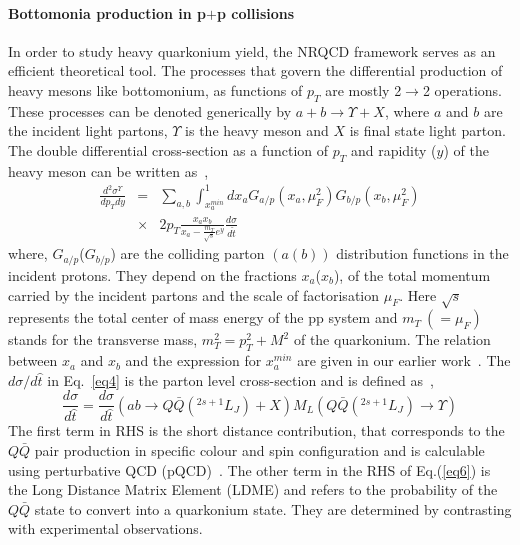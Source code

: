 \documentclass[review]{elsarticle}
\begin{document}
\paragraph{Bottomonia production in p$+$p collisions}
\label{sec:formalism}
In order to study heavy quarkonium yield, the NRQCD framework serves as an
efficient theoretical tool. The processes that govern the differential
production of heavy mesons like bottomonium, as functions of $p_T$ are mostly
2$\rightarrow$2 operations. These processes can be denoted generically by 
$a+b\rightarrow \Upsilon +X$, where $a$ and $b$ are the incident light partons,
$\Upsilon$ is the heavy meson and $X$ is final state light parton.
The double differential cross-section as a function of $p_T$ and rapidity ($y$) of 
the heavy meson can be written as~\cite{Kumar:2016ojy},
\begin{eqnarray}
  \nonumber
  \frac{d^2\sigma^{\Upsilon} }{dp_T dy} &=& \sum_{a,b} \int_{x_a^{min}}^1 dx_a G_{a/p}(x_a,\mu_F^2)
  G_{b/p}(x_b,\mu_F^2) \\
  &\times& 2p_T\frac{x_a x_b}{x_a - \frac{m_T}{\sqrt{s}}e^y}\frac{d\sigma}{d\hat{t}}
  \label{eq4}
\end{eqnarray}
where, $G_{a/p}$($G_{b/p}$) are the colliding parton $(a(b))$ distribution functions in
the incident protons. They depend on the fractions $x_a$($x_b$), of the total momentum
carried by the incident partons and the scale of factorisation $\mu_F$.
Here $\sqrt{s}$ represents the total center of mass energy of the pp system and $m_T~(=\mu_F)$ stands for
the transverse mass, $m_T^2=p_T^2 + M^2$ of the quarkonium. The relation between
$x_a$ and $x_b$ and the expression for $x_a^{min}$ are given in our earlier work~\cite{Kumar:2016ojy}.
The ${d\sigma}/{d\hat{t}}$ in Eq.~\ref{eq4} is the parton level cross-section and is
defined as~\cite{Bodwin:1994jh},
\begin{equation}
  \frac{d\sigma}{d\hat{t}} = \frac{d\sigma}{d\hat{t}}(ab\rightarrow Q\bar{Q}(^{2s+1}L_J)+X)
  M_L(Q\bar{Q}(^{2s+1}L_J)\rightarrow \Upsilon)
  \label{eq6}
\end{equation}
The first term in RHS is the short distance contribution, that corresponds to the $Q\bar{Q}$
pair production in specific colour and spin configuration and is calculable using 
perturbative QCD (pQCD)~\cite{Brateen:PRD2001,Baier:1983va,Humpert:1986cy,Gastmans:1987be,Cho:1995vh,Cho:1995ce}.
The other term in the RHS of Eq.(\ref{eq6}) is the Long Distance Matrix Element (LDME)
and refers to the probability of the $Q\bar{Q}$ state to convert into a quarkonium state.
They are determined by contrasting with experimental observations. 
\end{document}
